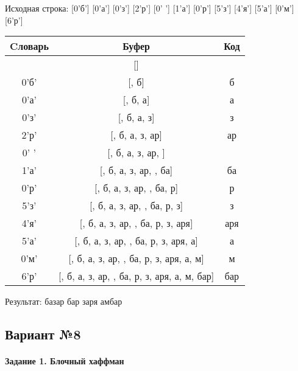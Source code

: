 \documentclass[a4paper, 12pt]{article}
\begin{document}
Исходная строка: [0'б'] [0'а'] [0'з'] [2'р'] [0' '] [1'а'] [0'р'] [5'з'] [4'я'] [5'а'] [0'м'] [6'р']\\
\begin{table}[h!]
\centering
\begin{tabular}{|c|c|c|}
\hline
 Cловарь & Буфер & Код  \\ \hline
 & [] & 
\\ \hline
0'б' & [, б] & б
\\ \hline
0'а' & [, б, а] & а
\\ \hline
0'з' & [, б, а, з] & з
\\ \hline
2'р' & [, б, а, з, ар] & ар
\\ \hline
0' ' & [, б, а, з, ар,  ] &  
\\ \hline
1'а' & [, б, а, з, ар,  , ба] & ба
\\ \hline
0'р' & [, б, а, з, ар,  , ба, р] & р
\\ \hline
5'з' & [, б, а, з, ар,  , ба, р,  з] &  з
\\ \hline
4'я' & [, б, а, з, ар,  , ба, р,  з, аря] & аря
\\ \hline
5'а' & [, б, а, з, ар,  , ба, р,  з, аря,  а] &  а
\\ \hline
0'м' & [, б, а, з, ар,  , ба, р,  з, аря,  а, м] & м
\\ \hline
6'р' & [, б, а, з, ар,  , ба, р,  з, аря,  а, м, бар] & бар
\\ \hline
\end{tabular}
\end{table}

Результат: базар бар заря амбар
\pagebreak
\subsection{Вариант №8}
\paragraph{Задание 1. Блочный хаффман \\}
\end{document}
